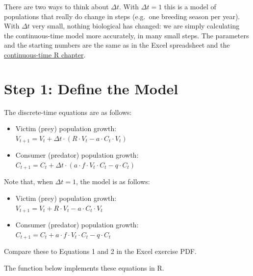 \documentclass[
  a4paper]{book}
\begin{document}
There are two ways to think about \(\Delta t\). With \(\Delta t = 1\) this is a model of populations that really do change in steps (e.g.~one breeding season per year). With \(\Delta t\) very small, nothing biological has changed: we are simply calculating the continuous-time model more accurately, in many small steps. The parameters and the starting numbers are the same as in the Excel spreadsheet and the \href{continuous-time-lotka-volterra-predator-prey-model-in-r.html}{continuous-time R chapter}.

\section{Step 1: Define the Model}\label{step-1-define-the-model}

The discrete-time equations are as follows:

\begin{itemize}
\item
  Victim (prey) population growth:\\
  \(V_{t+1} = V_t + \Delta t \cdot (R \cdot V_t - a \cdot C_t \cdot V_t)\)
\item
  Consumer (predator) population growth:\\
  \(C_{t+1} = C_t + \Delta t \cdot (a \cdot f \cdot V_t \cdot C_t - q \cdot C_t)\)
\end{itemize}

Note that, when \(\Delta t = 1\), the model is as follows:

\begin{itemize}
\item
  Victim (prey) population growth:\\
  \(V_{t+1} = V_t + R \cdot V_t - a \cdot C_t \cdot V_t\)
\item
  Consumer (predator) population growth:\\
  \(C_{t+1} = C_t + a \cdot f \cdot V_t \cdot C_t - q \cdot C_t\)
\end{itemize}

Compare these to Equations 1 and 2 in the Excel exercise PDF.

The function below implements these equations in R.
\end{document}
